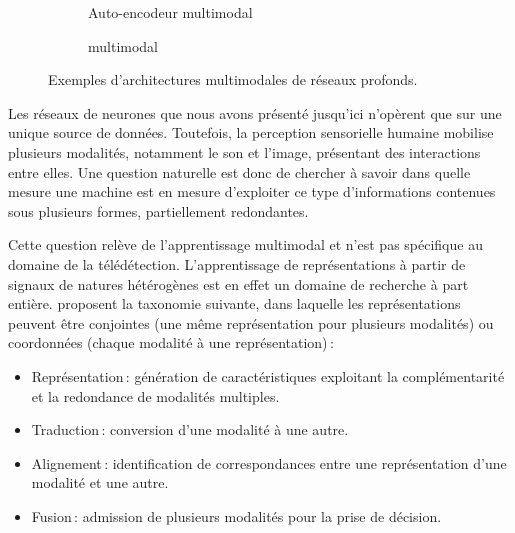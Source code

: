 \begin{figure}[h]
  \hfill
  \begin{subfigure}[b]{0.43\textwidth}
    \resizebox{\textwidth}{!}{
      
    }
    \caption{Auto-encodeur multimodal~\cite{ngiam_multimodal_2011}}
    \label{fig:ae_multimodal}
  \end{subfigure}%
  \hfill
  \begin{subfigure}[b]{0.53\textwidth}
    \resizebox{\textwidth}{!}{
      
    }
    \caption{ multimodal~\cite{eitel_multimodal_2015}}
    \label{fig:cnn_multimodal}
  \end{subfigure}
  \hfill
  \caption{Exemples d'architectures multimodales de réseaux profonds.}
  \label{fig:deep_multimodal}
\end{figure}

Les réseaux de neurones que nous avons présenté jusqu'ici n'opèrent que sur une unique source de données. Toutefois, la perception sensorielle humaine mobilise plusieurs modalités, notamment le son et l'image, présentant des interactions entre elles. Une question naturelle est donc de chercher à savoir dans quelle mesure une machine est en mesure d'exploiter ce type d'informations contenues sous plusieurs formes, partiellement redondantes.

Cette question relève de l'apprentissage multimodal et n'est pas spécifique au domaine de la télédétection. L'apprentissage de représentations à partir de signaux de natures hétérogènes est en effet un domaine de recherche à part entière. \citet{baltrusaitis_multimodal_2017} proposent la taxonomie suivante, dans laquelle les représentations peuvent être conjointes (une même représentation pour plusieurs modalités) ou coordonnées (chaque modalité à une représentation)\,:
\begin{itemize}
    \item Représentation\,: génération de caractéristiques exploitant la complémentarité et la redondance de modalités multiples.
    \item Traduction\,: conversion d'une modalité à une autre.
    \item Alignement\,: identification de correspondances entre une représentation d'une modalité et une autre.
    \item Fusion\,: admission de plusieurs modalités pour la prise de décision.
\end{itemize}

